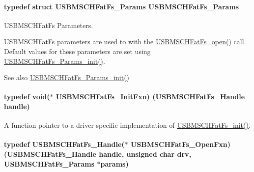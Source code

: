 \paragraph[{U\+S\+B\+M\+S\+C\+H\+Fat\+Fs\+\_\+\+Params}]{\setlength{\rightskip}{0pt plus 5cm}typedef struct {\bf U\+S\+B\+M\+S\+C\+H\+Fat\+Fs\+\_\+\+Params}  {\bf U\+S\+B\+M\+S\+C\+H\+Fat\+Fs\+\_\+\+Params}}\label{_u_s_b_m_s_c_h_fat_fs_8h_a06f74db1fc3ff6554070ee18b255b6f2}


U\+S\+B\+M\+S\+C\+H\+Fat\+Fs Parameters. 

U\+S\+B\+M\+S\+C\+H\+Fat\+Fs parameters are used to with the \hyperlink{_u_s_b_m_s_c_h_fat_fs_8h_a64956f1bd732672e4cd5592a4fef4a09}{U\+S\+B\+M\+S\+C\+H\+Fat\+Fs\+\_\+open()} call. Default values for these parameters are set using \hyperlink{_u_s_b_m_s_c_h_fat_fs_8h_ae46d9bf936f1837eddea6e787954afec}{U\+S\+B\+M\+S\+C\+H\+Fat\+Fs\+\_\+\+Params\+\_\+init()}.

\begin{DoxySeeAlso}{See also}
\hyperlink{_u_s_b_m_s_c_h_fat_fs_8h_ae46d9bf936f1837eddea6e787954afec}{U\+S\+B\+M\+S\+C\+H\+Fat\+Fs\+\_\+\+Params\+\_\+init()} 
\end{DoxySeeAlso}
\paragraph[{U\+S\+B\+M\+S\+C\+H\+Fat\+Fs\+\_\+\+Init\+Fxn}]{\setlength{\rightskip}{0pt plus 5cm}typedef void($\ast$ U\+S\+B\+M\+S\+C\+H\+Fat\+Fs\+\_\+\+Init\+Fxn) ({\bf U\+S\+B\+M\+S\+C\+H\+Fat\+Fs\+\_\+\+Handle} handle)}\label{_u_s_b_m_s_c_h_fat_fs_8h_a2909390706605acd0972b1d77aa449e5}


A function pointer to a driver specific implementation of \hyperlink{_u_s_b_m_s_c_h_fat_fs_8h_a70cc0939d4a838e87e3bb4742dae442e}{U\+S\+B\+M\+S\+C\+H\+Fat\+Fs\+\_\+init()}. 

\paragraph[{U\+S\+B\+M\+S\+C\+H\+Fat\+Fs\+\_\+\+Open\+Fxn}]{\setlength{\rightskip}{0pt plus 5cm}typedef {\bf U\+S\+B\+M\+S\+C\+H\+Fat\+Fs\+\_\+\+Handle}($\ast$ U\+S\+B\+M\+S\+C\+H\+Fat\+Fs\+\_\+\+Open\+Fxn) ({\bf U\+S\+B\+M\+S\+C\+H\+Fat\+Fs\+\_\+\+Handle} handle, unsigned char drv, {\bf U\+S\+B\+M\+S\+C\+H\+Fat\+Fs\+\_\+\+Params} $\ast$params)}\label{_u_s_b_m_s_c_h_fat_fs_8h_ae4916284bc1646118c40574df42a4bc8}


